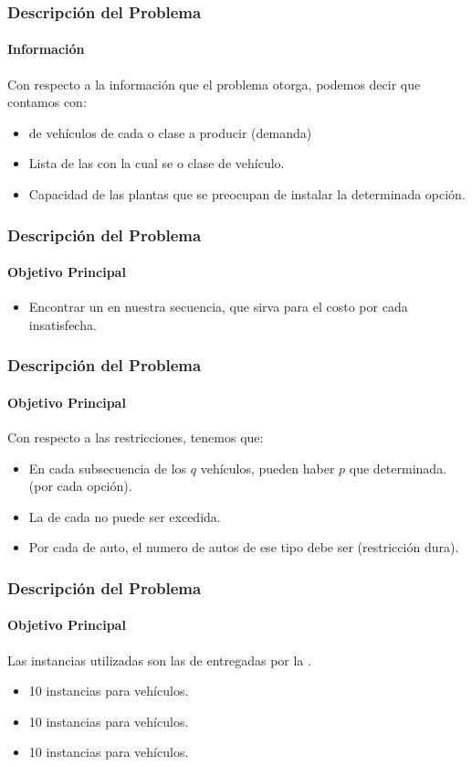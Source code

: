 \frame
{
\frametitle{Descripción del Problema}
\framesubtitle{Información}

Con respecto a la información que el problema otorga, podemos decir que contamos con:
\begin{itemize}
    \item {} de vehículos de cada  o clase a producir (demanda)
    \item Lista de las  con la cual se  o clase
		de vehículo.
    \item Capacidad de las plantas que se preocupan de instalar la determinada opción.
\end{itemize}
}

\frame
{
\frametitle{Descripción del Problema}
\framesubtitle{Objetivo Principal}
\begin{itemize}
    \item Encontrar un  en nuestra secuencia,
		que sirva para  el costo por cada  insatisfecha.
\end{itemize}
}

\frame
{
\frametitle{Descripción del Problema}
\framesubtitle{Objetivo Principal}
Con respecto a las restricciones, tenemos que:
\begin{itemize}
    \item En cada subsecuencia de los $q$ vehículos,
		 pueden haber $p$ que  determinada.
		(por cada opción).
    \item La  de cada  no puede ser excedida.
    \item Por cada  de auto, el numero de autos de ese tipo debe ser
		 (restricción dura).
\end{itemize}
}

\frame
{
\frametitle{Descripción del Problema}
\framesubtitle{Objetivo Principal}
Las instancias utilizadas son las de entregadas por la .
\begin{itemize}
    \item 10 instancias para  vehículos.
    \item 10 instancias para  vehículos.
    \item 10 instancias para  vehículos.
\end{itemize}
}
